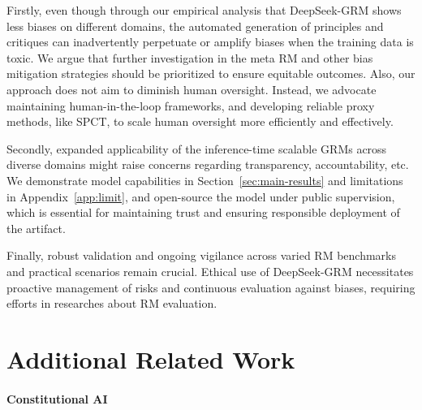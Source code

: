 \documentclass{article} %
\newcommand{\SGRMAll}{DeepSeek-GRM\xspace}
\begin{document}
Firstly, even though through our empirical analysis that \SGRMAll shows less biases  on different domains, the automated generation of principles and critiques can inadvertently perpetuate or amplify biases when the training data is toxic. We argue that further investigation in the meta RM and other bias mitigation strategies should be prioritized to ensure equitable outcomes.
Also, our approach does not aim to diminish human oversight. Instead, we advocate maintaining human-in-the-loop frameworks, and developing reliable proxy methods, like SPCT, to scale human oversight more efficiently and effectively. 

Secondly, expanded applicability of the inference-time scalable GRMs across diverse domains might raise concerns regarding transparency, accountability, etc. We demonstrate model capabilities in Section~\ref{sec:main-results} and limitations in Appendix~\ref{app:limit}, and open-source the model under public supervision, which is essential for maintaining trust and ensuring responsible deployment of the artifact.

Finally, robust validation and ongoing vigilance across varied RM benchmarks and practical scenarios remain crucial. Ethical use of \SGRMAll necessitates proactive management of risks and continuous evaluation against biases, requiring efforts in researches about RM evaluation.





\appendix

\newpage

\begin{spacing}{0.9}
\tableofcontents
\end{spacing}

\newpage

\section{Additional Related Work}

\paragraph{Constitutional AI}
\end{document}
